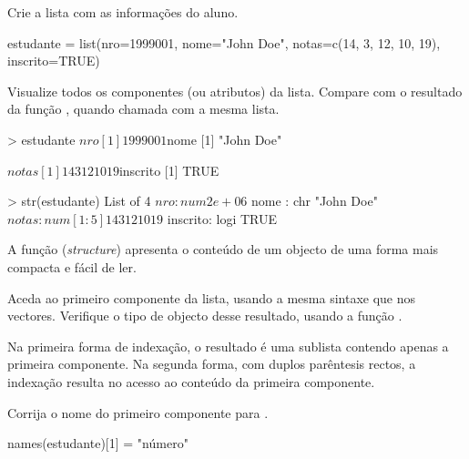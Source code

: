 \documentclass{exam}
\begin{document}
\begin{questions}
\question Crie a lista  com as informações do aluno.
\begin{solution}
	\begin{rcode}
		 estudante = list(nro=1999001, nome="John Doe", notas=c(14, 3, 12, 10, 19),
		   inscrito=TRUE)
	\end{rcode}
\end{solution}

\question Visualize todos os componentes (ou atributos) da lista. Compare com o resultado da função , quando chamada com a mesma lista.
\begin{solution}
	\begin{rcode}
		> estudante
		$nro
		[1] 1999001
		
		$nome
		[1] "John Doe"
		
		$notas
		[1] 14  3 12 10 19
		
		$inscrito
		[1] TRUE
		
		> str(estudante)
		List of 4
		$ nro     : num 2e+06
		$ nome    : chr "John Doe"
		$ notas   : num [1:5] 14 3 12 10 19
		$ inscrito: logi TRUE
	\end{rcode}
	A função  (\textit{structure}) apresenta o conteúdo de um objecto de uma forma mais compacta e fácil de ler.
\end{solution}

\question Aceda ao primeiro componente da lista, usando a mesma sintaxe que nos vectores. Verifique o tipo de objecto desse resultado, usando a função .

\begin{solution}
	Na primeira forma de indexação, o resultado é uma sublista contendo apenas a primeira componente. Na segunda forma, com duplos parêntesis rectos, a indexação resulta no acesso ao conteúdo da primeira componente.
\end{solution}

\question Corrija o nome do primeiro componente para .

\begin{solution}
	\begin{rcode}
		names(estudante)[1] = "número"
	\end{rcode}
\end{solution}


\end{questions}
\end{document}
